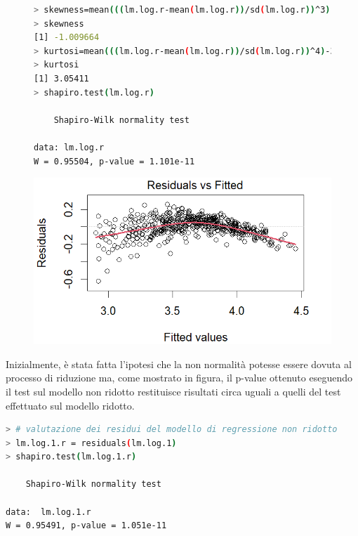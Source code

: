 \documentclass[11pt,a4paper]{article}
\begin{document}
\begin{figure}[h]
    \hspace{-2.00cm}
    \begin{minipage}{.6\textwidth} 
    	\begin{lstlisting}[language=bash,basicstyle=\tiny,tabsize=2,frame = single]
> skewness=mean(((lm.log.r-mean(lm.log.r))/sd(lm.log.r))^3)
> skewness
[1] -1.009664
> kurtosi=mean(((lm.log.r-mean(lm.log.r))/sd(lm.log.r))^4)-3
> kurtosi
[1] 3.05411
> shapiro.test(lm.log.r)
        
    Shapiro-Wilk normality test
        
data: lm.log.r
W = 0.95504, p-value = 1.101e-11
    	\end{lstlisting}
    \end{minipage}
    \hspace{0.07\textwidth}%
    \begin{minipage}{0.5\textwidth} 
    	\includegraphics[scale=.45]{imgs/residuals_log_model.png}
    \end{minipage}
\end{figure}

Inizialmente, è stata fatta l'ipotesi che la non normalità potesse essere dovuta al processo di riduzione ma, come mostrato in figura, il p-value ottenuto eseguendo il test sul modello non ridotto restituisce risultati circa uguali a quelli del test effettuato sul modello ridotto.

\newpage
\begin{lstlisting}[language=bash,basicstyle=\tiny,tabsize=2,frame = single]
> # valutazione dei residui del modello di regressione non ridotto
> lm.log.1.r = residuals(lm.log.1)
> shapiro.test(lm.log.1.r)

	Shapiro-Wilk normality test

data:  lm.log.1.r
W = 0.95491, p-value = 1.051e-11
\end{lstlisting}
\vspace{0.5cm}
\end{document}
